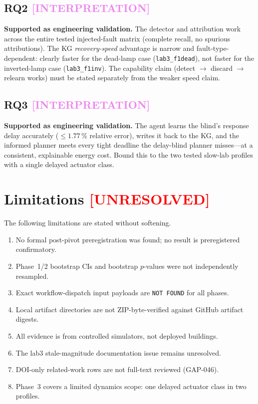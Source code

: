 \documentclass[12pt, a4paper, oneside]{memoir}
\newcommand{\evInterp}{\textcolor{violet}{[INTERPRETATION]}}
\newcommand{\evUnresolved}{\textcolor{red}{[UNRESOLVED]}}
\begin{document}
\subsection{RQ2 \evInterp}

\textbf{Supported as engineering validation.}  The detector and attribution
work across the entire tested injected-fault matrix (complete recall, no
spurious attributions).  The KG \emph{recovery-speed} advantage is narrow
and fault-type-dependent: clearly faster for the dead-lamp case
(\texttt{lab3\_f1dead}), not faster for the inverted-lamp case
(\texttt{lab3\_f1inv}).  The capability claim (detect $\to$ discard $\to$
relearn works) must be stated separately from the weaker speed claim.

\subsection{RQ3 \evInterp}

\textbf{Supported as engineering validation.}  The agent learns the blind's
response delay accurately (${\leq}1.77\,\%$ relative error), writes it back
to the KG, and the informed planner meets every tight deadline the
delay-blind planner misses---at a consistent, explainable energy cost.  Bound
this to the two tested slow-lab profiles with a single delayed actuator class.

\section{Limitations \evUnresolved}
\label{sec:conc-limitations}

The following limitations are stated without softening.

\begin{enumerate}
  \item No formal post-pivot preregistration was found; no result is
        preregistered confirmatory.
  \item Phase~1/2 bootstrap CIs and bootstrap $p$-values were not
        independently resampled.
  \item Exact workflow-dispatch input payloads are \texttt{NOT FOUND} for all
        phases.
  \item Local artifact directories are not ZIP-byte-verified against GitHub
        artifact digests.
  \item All evidence is from controlled simulators, not deployed buildings.
  \item The lab3 stale-magnitude documentation issue remains unresolved.
  \item DOI-only related-work rows are not full-text reviewed (GAP-046).
  \item Phase~3 covers a limited dynamics scope: one delayed actuator class
        in two profiles.
\end{enumerate}
\end{document}
